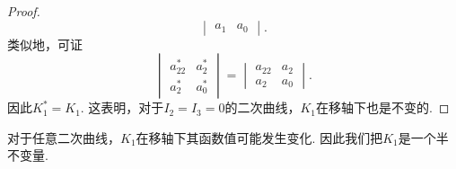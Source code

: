 \begin{theorem}
\begin{proof}
\begin{equation*}
\begin{vmatrix}
		a_1 & a_0
	\end{vmatrix}.
\end{equation*}
类似地，可证\begin{equation*}
	\begin{vmatrix}
		a^*_{22} & a^*_2 \\
		a^*_2 & a^*_0
	\end{vmatrix}
	= \begin{vmatrix}
		a_{22} & a_2 \\
		a_2 & a_0
	\end{vmatrix}.
\end{equation*}
因此\(K_1^* = K_1\).
这表明，对于\(I_2 = I_3 = 0\)的二次曲线，\(K_1\)在移轴下也是不变的.
\end{proof}
\end{theorem}
\begin{remark}
对于任意二次曲线，\(K_1\)在移轴下其函数值可能发生变化.
因此我们把\(K_1\)是一个半不变量.
\end{remark}

